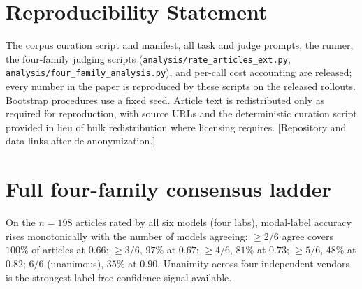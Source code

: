 \documentclass{article}
\newcommand{\pending}[1]{\textcolor{orange!80!black}{[#1]}}
\begin{document}
\section*{Reproducibility Statement}
The corpus curation script and manifest, all task and judge prompts, the
runner, the four-family judging scripts
(\texttt{analysis/rate\_articles\_ext.py},
\texttt{analysis/four\_family\_analysis.py}), and per-call cost
accounting are released; every number in the paper is reproduced by these
scripts on the released rollouts. Bootstrap procedures use a fixed seed.
Article text is redistributed only as required for reproduction, with
source URLs and the deterministic curation script provided in lieu of
bulk redistribution where licensing requires. \pending{Repository and
data links after de-anonymization.}




\appendix
\section{Full four-family consensus ladder}
On the $n{=}198$ articles rated by all six models (four labs), modal-label
accuracy rises monotonically with the number of models agreeing:
$\ge2/6$ agree covers $100\%$ of articles at $0.66$; $\ge3/6$, $97\%$ at
$0.67$; $\ge4/6$, $81\%$ at $0.73$; $\ge5/6$, $48\%$ at $0.82$; $6/6$
(unanimous), $35\%$ at $0.90$. Unanimity across four independent vendors
is the strongest label-free confidence signal available.
\end{document}
